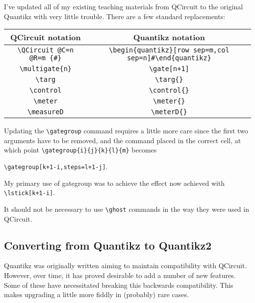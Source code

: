 \documentclass[aps,pra,10pt,nofootinbib]{revtex4-2}
\begin{document}
I've updated all of my existing teaching materials from QCircuit to the original Quantikz with very little trouble. There are a few standard replacements:
\begin{center}
\begin{tabular}{c|c}
QCircuit notation & Quantikz notation \\
\hline
\verb!\QCircuit @C=n @R=m {#}! & \verb!\begin{quantikz}[row sep=m,col sep=n]#\end{quantikz}!	\\
\verb!\multigate{n}! & \verb!\gate[n+1]!	\\
\verb!\targ! & \verb!\targ{}! \\
\verb!\control! & \verb!\control{}! \\
\verb!\meter! & \verb!\meter{}! \\
\verb!\measureD! & \verb!\meterD{}! \\
\end{tabular}
\end{center}
Updating the \verb!\gategroup! command requires a little more care since the first two arguments have to be removed, and the command placed in the correct cell, at which point \verb!\gategroup{i}{j}{k}{l}{m}! becomes 
\begin{center}
\verb!\gategroup[k+1-i,steps=l+1-j]!.
\end{center}
My primary use of gategroup was to achieve the effect now achieved with \verb!\lstick[k+1-i]!.

It should not be necessary to use \verb!\ghost! commands in the way they were used in QCircuit.

\subsection{Converting from Quantikz to Quantikz2}

Quantikz was originally written aiming to maintain compatibility with QCircuit. However, over time, it has proved desirable to add a number of new features. Some of these have necessitated breaking this backwards compatibility. This makes upgrading a little more fiddly in (probably) rare cases.
\end{document}
